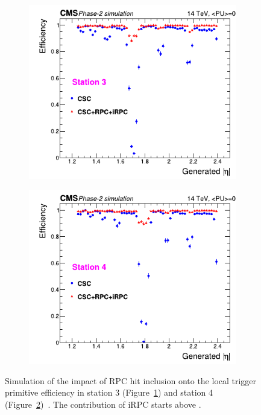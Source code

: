 	\begin{figure}[H]
		\begin{subfigure}{0.5\linewidth}
			\centering
			\includegraphics[width=\linewidth]{fig/chapt3/Trigger-efficiency-endcap-3.pdf}
			\caption{\label{fig:Endcap-trigger-eff:A}}
		\end{subfigure}
		\begin{subfigure}{0.5\linewidth}
			\centering
			\includegraphics[width=\linewidth]{fig/chapt3/Trigger-efficiency-endcap-4.pdf}
			\caption{\label{fig:Endcap-trigger-eff:B}}
		\end{subfigure}
		\caption{\label{fig:Endcap-trigger-eff} Simulation of the impact of RPC hit inclusion onto the local trigger primitive efficiency in station 3 (Figure~\ref{fig:Endcap-trigger-eff:A}) and station 4 (Figure~\ref{fig:Endcap-trigger-eff:B})~\cite{PHASEIITP}. The contribution of iRPC starts above .}
	\end{figure}
	
